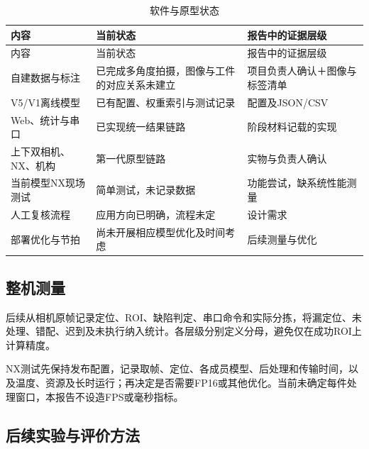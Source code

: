 \begingroup\small{}
\begin{longtable}{@{}>{\raggedright\arraybackslash}p{0.240\dimexpr\linewidth-4\tabcolsep\relax}>{\raggedright\arraybackslash}p{0.340\dimexpr\linewidth-4\tabcolsep\relax}>{\raggedright\arraybackslash}p{0.420\dimexpr\linewidth-4\tabcolsep\relax}@{}}
\caption{软件与原型状态}\\
\toprule
内容 & 当前状态 & 报告中的证据层级 \\
\midrule\endfirsthead
\toprule
内容 & 当前状态 & 报告中的证据层级 \\
\midrule\endhead
\midrule\multicolumn{3}{r}{\footnotesize 续下页}\endfoot
\bottomrule\endlastfoot
自建数据与标注 & 已完成多角度拍摄，图像与工件的对应关系未建立 & 项目负责人确认＋图像与标签清单 \\
V5/V1离线模型 & 已有配置、权重索引与测试记录 & 配置及JSON/CSV \\
Web、统计与串口 & 已实现统一结果链路 & 阶段材料记载的实现 \\
上下双相机、NX、机构 & 第一代原型链路 & 实物与负责人确认 \\
当前模型NX现场测试 & 简单测试，未记录数据 & 功能尝试，缺系统性能测量 \\
人工复核流程 & 应用方向已明确，流程未定 & 设计需求 \\
部署优化与节拍 & 尚未开展相应模型优化及时间考虑 & 后续测量与优化 \\
\end{longtable}\endgroup

\FloatBarrier{}\subsection{整机测量}
后续从相机原帧记录定位、ROI、缺陷判定、串口命令和实际分拣，将漏定位、未处理、错配、迟到及未执行纳入统计。各层级分别定义分母，避免仅在成功ROI上计算精度。

NX测试先保持发布配置，记录取帧、定位、各成员模型、后处理和传输时间，以及温度、资源及长时运行；再决定是否需要FP16或其他优化。当前未确定每件处理窗口，本报告不设造FPS或毫秒指标。

\FloatBarrier{}\subsection{后续实验与评价方法}

